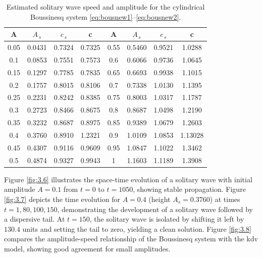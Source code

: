 \documentclass[alpha-refs, 12pt]{wiley-article}
\begin{document}
\begin{table}
  \caption{\label{tab2.2} Estimated solitary wave speed and amplitude for the cylindrical Boussinesq system \eqref{eq:bousnew1}--\eqref{eq:bousnew2}.}
  \begin{center}
  \begin{tabular}{ |c       c       c       c | c       c       c       c | } 
   \hline
    A & $A_{\,s}$ & $c_{\,s}$ & c& A & $A_{\,s}$ & $c_{\,s}$ & c\\
    \hline
   0.05 & 0.0431 & 0.7324 & 0.7325& 0.55 & 0.5460 & 0.9521 & 1.0288 \\
   \hline
   0.1 & 0.0853 & 0.7551& 0.7573 & 0.6 &  0.6066 & 0.9736 & 1.0645\\ 
   \hline
   0.15 &  0.1297 & 0.7785 & 0.7835 & 0.65 & 0.6693 & 0.9938 & 1.1015\\
   \hline
   0.2 & 0.1757 & 0.8015 & 0.8106 & 0.7 &   0.7338 & 1.0130 & 1.1395\\ 
   \hline
   0.25 & 0.2231 & 0.8242 & 0.8385& 0.75 & 0.8003 & 1.0317 & 1.1787 \\
    \hline
   0.3 & 0.2723 & 0.8466 & 0.8675 & 0.8 & 0.8687 & 1.0498 & 1.2190\\
   \hline
   0.35 & 0.3232 & 0.8687 & 0.8975 & 0.85 & 0.9389  & 1.0679 & 1.2603 \\
    \hline
   0.4 &  0.3760 & 0.8910 & 1.2321 & 0.9 & 1.0109 & 1.0853 &1.13028\\
    \hline
    0.45 & 0.4307  & 0.9116 & 0.9609 & 0.95 & 1.0847&1.1022 & 1.3462  \\
    \hline
    0.5 &   0.4874 & 0.9327 & 0.9943 & 1 & 1.1603 & 1.1189 & 1.3908\\
   \hline
  \end{tabular}
  \end{center}
\end{table}

Figure \ref{fig:3.6} illustrates the space-time evolution of a solitary wave with initial amplitude $A = 0.1$ from $t = 0$ to $t = 1050$, showing stable propagation. Figure \ref{fig:3.7} depicts the time evolution for $A = 0.4$ (height $A_s = 0.3760$) at times $t = 1, 80, 100, 150$, demonstrating the development of a solitary wave followed by a dispersive tail. At $t = 150$, the solitary wave is isolated by shifting it left by $130.4$ units and setting the tail to zero, yielding a clean solution. Figure \ref{fig:3.8} compares the amplitude-speed relationship of the Boussinesq system with the \acrshort{kdv} model, showing good agreement for small amplitudes.
\end{document}
